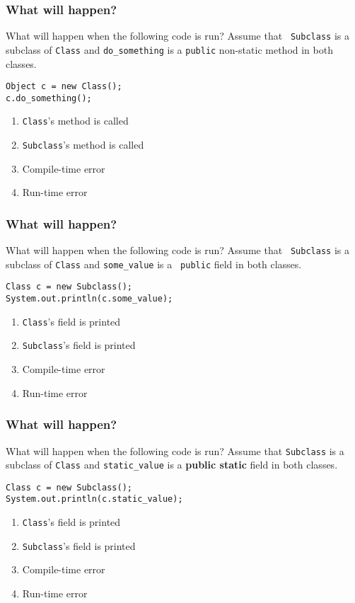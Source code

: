 \documentclass[9pt]{beamer}
\begin{document}
\begin{frame}[fragile]
  \frametitle{What will happen?}
  What will happen when the following code is run? Assume that {\tt
  Subclass} is a subclass of {\tt Class} and {\tt do\_something} is a
  {\tt public} non-static method in both classes.
  \begin{lstlisting}
Object c = new Class();
c.do_something();
  \end{lstlisting}
  \begin{enumerate}
    \item
      {\tt Class}'s method is called
    \item
      {\tt Subclass}'s method is called
    \item
      \alert<2>{Compile-time error}
    \item
      Run-time error
  \end{enumerate}
\end{frame}

\begin{frame}[fragile]
  \frametitle{What will happen?}
  What will happen when the following code is run? Assume that {\tt
  Subclass} is a subclass of {\tt Class} and {\tt some\_value} is a {\tt
  public} field in both classes.
  \begin{lstlisting}
Class c = new Subclass();
System.out.println(c.some_value);
  \end{lstlisting}
  \begin{enumerate}
    \item
      \alert<2>{{\tt Class}'s field is printed}
    \item
      {\tt Subclass}'s field is printed
    \item
      Compile-time error
    \item
      Run-time error
  \end{enumerate}
\end{frame}

\begin{frame}[fragile]
  \frametitle{What will happen?}
  What will happen when the following code is run? Assume that {\tt Subclass} is
  a subclass of {\tt Class} and {\tt static\_value} is a {\bf public static}
  field in both classes.
  \begin{lstlisting}
Class c = new Subclass();
System.out.println(c.static_value);
  \end{lstlisting}
  \begin{enumerate}
    \item
      \alert<2>{{\tt Class}'s field is printed}
    \item
      {\tt Subclass}'s field is printed
    \item
      Compile-time error
    \item
      Run-time error
  \end{enumerate}
\end{frame}
\end{document}
